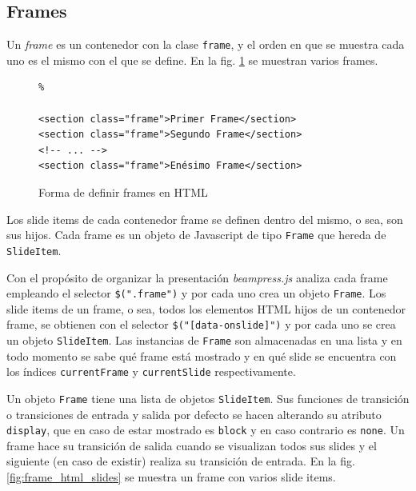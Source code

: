 
		\subsection{Frames} %
		 \label{sub:frames}
		 
		  
			Un \textit{frame} es un contenedor con la clase \texttt{frame}, y el orden en que se muestra cada uno es el mismo con el que se define. En la fig. \ref{fig:frames_html} se muestran varios frames.


				\begin{figure}[htb]%
					\begin{lstlisting}%

<section class="frame">Primer Frame</section>
<section class="frame">Segundo Frame</section>
<!-- ... -->
<section class="frame">Enésimo Frame</section>
					\end{lstlisting}
					\caption{Forma de definir frames en HTML}
					\label{fig:frames_html}
				\end{figure}

			Los slide items de cada contenedor frame se definen dentro del mismo, o sea, son sus hijos. Cada frame es un objeto de Javascript de tipo \texttt{Frame} que hereda de \texttt{SlideItem}.

			Con el propósito de organizar la presentación \textit{beampress.js} analiza cada frame empleando el selector \texttt{\$(".frame")} y por cada uno crea un objeto \texttt{Frame}. Los slide items de un frame, o sea, todos los elementos HTML hijos de un contenedor frame, se obtienen con el selector \texttt{\$("[data-onslide]")} y por cada uno se crea un objeto \texttt{SlideItem}. Las instancias de \texttt{Frame} son almacenadas en una lista y en todo momento se sabe qué frame está mostrado y en qué slide se encuentra con los índices \texttt{currentFrame} y \texttt{currentSlide} respectivamente.

			Un objeto \texttt{Frame} tiene una lista de objetos \texttt{SlideItem}. Sus funciones de transición o transiciones de entrada y salida por defecto se hacen alterando su atributo \texttt{display}, que en caso de estar mostrado es \texttt{block} y en caso contrario es \texttt{none}. Un frame hace su transición de salida cuando se visualizan todos sus slides y el siguiente (en caso de existir) realiza su transición de entrada. En la fig. \ref{fig:frame_html_slides} se muestra un frame con varios slide items.

